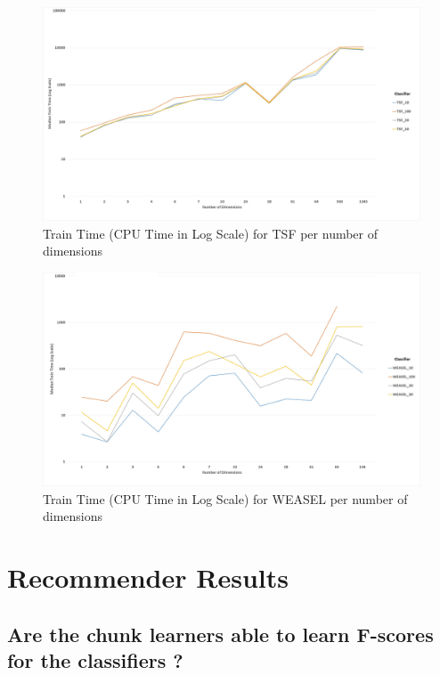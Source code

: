   \begin{figure} [!htb]
    \centering
    \includegraphics[width=\textwidth]{./Chapters/06 Results/Duration_tsf_dim.jpg}
    \caption{Train Time (CPU Time in Log Scale) for TSF per number of dimensions}
  \end{figure}

  \begin{figure} [!htb]
    \centering
    \includegraphics[width=\textwidth]{./Chapters/06 Results/Duration_weasel_dim.jpg}
    \caption{Train Time (CPU Time in Log Scale) for WEASEL per number of dimensions}
  \end{figure}



\chapter{Recommender Results}
  \section{Are the chunk learners able to learn F-scores for the classifiers ?}

